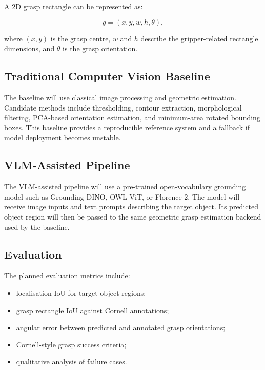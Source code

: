 \documentclass[11pt,a4paper]{article}
\begin{document}
A 2D grasp rectangle can be represented as:

\begin{equation}
    g = (x, y, w, h, \theta),
\end{equation}

where $(x, y)$ is the grasp centre, $w$ and $h$ describe the gripper-related rectangle dimensions, and $\theta$ is the grasp orientation.

\subsection{Traditional Computer Vision Baseline}

The baseline will use classical image processing and geometric estimation. Candidate methods include thresholding, contour extraction, morphological filtering, PCA-based orientation estimation, and minimum-area rotated bounding boxes. This baseline provides a reproducible reference system and a fallback if model deployment becomes unstable.

\subsection{VLM-Assisted Pipeline}

The VLM-assisted pipeline will use a pre-trained open-vocabulary grounding model such as Grounding DINO, OWL-ViT, or Florence-2. The model will receive image inputs and text prompts describing the target object. Its predicted object region will then be passed to the same geometric grasp estimation backend used by the baseline.

\subsection{Evaluation}

The planned evaluation metrics include:

\begin{itemize}
    \item localisation IoU for target object regions;
    \item grasp rectangle IoU against Cornell annotations;
    \item angular error between predicted and annotated grasp orientations;
    \item Cornell-style grasp success criteria;
    \item qualitative analysis of failure cases.
\end{itemize}
\end{document}

